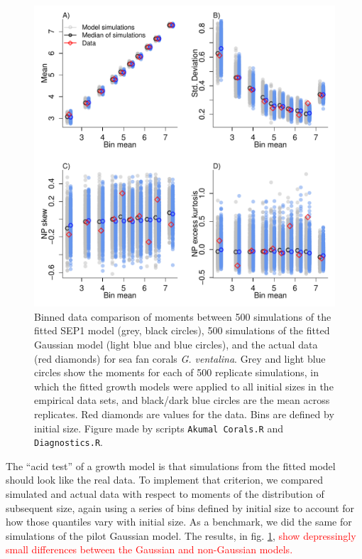\documentclass[11pt]{article}
\newcommand{\new}{\textcolor{red}}
\begin{document}
{\begin{figure}[tbp]
\centering
\includegraphics[width=.95\textwidth]{figures/CoralMomentsComparePlot.pdf}
\caption{Binned data comparison of moments between 500 simulations of the fitted SEP1 model (grey, black circles), 500 simulations
of the fitted Gaussian model (light blue and blue circles), and the actual data (red diamonds) for sea fan corals \emph{G. ventalina}. 
Grey and light blue circles show the moments for each of 500 replicate simulations,
in which the fitted growth models were applied to all initial sizes in the empirical data sets, and black/dark blue circles are the mean
across replicates. Red diamonds are values for the data. Bins are defined by initial size. Figure
made by scripts \texttt{Akumal Corals.R} and \texttt{Diagnostics.R}.}
\label{fig:CoralMomentsCompare}
\end{figure} 

The ``acid test'' of a growth model is that simulations from the fitted model should look like the real data. 
To implement that criterion, we compared simulated and actual data with respect to moments of the distribution
of subsequent size, again using a series of bins defined by initial size to account for how those quantiles vary
with initial size. As a benchmark, we did the same for simulations of the pilot Gaussian model. The results, in  
fig. \ref{fig:CoralMomentsCompare}, \new{show depressingly small differences between the Gaussian and non-Gaussian models.} 
 
}
\end{document}
